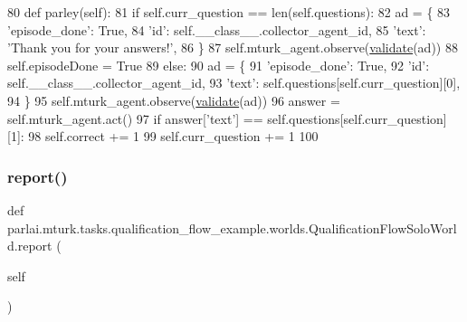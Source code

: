 \begin{DoxyCode}
80     \textcolor{keyword}{def }parley(self):
81         \textcolor{keywordflow}{if} self.curr\_question == len(self.questions):
82             ad = \{
83                 \textcolor{stringliteral}{'episode\_done'}: \textcolor{keyword}{True},
84                 \textcolor{stringliteral}{'id'}: self.\_\_class\_\_.collector\_agent\_id,
85                 \textcolor{stringliteral}{'text'}: \textcolor{stringliteral}{'Thank you for your answers!'},
86             \}
87             self.mturk\_agent.observe(\hyperlink{namespaceparlai_1_1core_1_1worlds_afc3fad603b7bce41dbdc9cdc04a9c794}{validate}(ad))
88             self.episodeDone = \textcolor{keyword}{True}
89         \textcolor{keywordflow}{else}:
90             ad = \{
91                 \textcolor{stringliteral}{'episode\_done'}: \textcolor{keyword}{True},
92                 \textcolor{stringliteral}{'id'}: self.\_\_class\_\_.collector\_agent\_id,
93                 \textcolor{stringliteral}{'text'}: self.questions[self.curr\_question][0],
94             \}
95             self.mturk\_agent.observe(\hyperlink{namespaceparlai_1_1core_1_1worlds_afc3fad603b7bce41dbdc9cdc04a9c794}{validate}(ad))
96             answer = self.mturk\_agent.act()
97             \textcolor{keywordflow}{if} answer[\textcolor{stringliteral}{'text'}] == self.questions[self.curr\_question][1]:
98                 self.correct += 1
99             self.curr\_question += 1
100 
\end{DoxyCode}
\mbox{\label{classparlai_1_1mturk_1_1tasks_1_1qualification__flow__example_1_1worlds_1_1QualificationFlowSoloWorld_a2e729506d1acc84ad4cf35bc5be02a0e}} 
\subsubsection{\texorpdfstring{report()}{report()}}
{\footnotesize\ttfamily def parlai.\+mturk.\+tasks.\+qualification\+\_\+flow\+\_\+example.\+worlds.\+Qualification\+Flow\+Solo\+World.\+report (\begin{DoxyParamCaption}\item[{}]{self }\end{DoxyParamCaption})}



